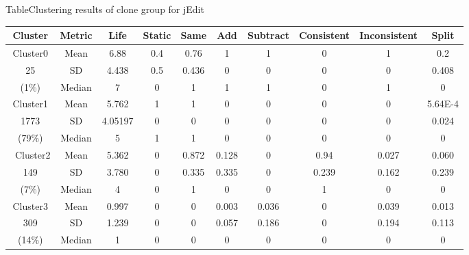 \begin{table}[htbp]
{Table$\!$}{Clustering results of clone group for jEdit}
\vspace{0.5em}
\centering
\footnotesize
\begin{tabular}{cccccccccc}
\toprule[1.5pt]
{Cluster}&{Metric}&Life&Static &Same &Add &Subtract &Consistent &	Inconsistent &Split \\ 
\midrule[1pt]
Cluster0&	Mean	&6.88	&0.4	&0.76	&1	&1	&0	&1	&0.2\\
25	&SD&4.438	&0.5	&0.436	&0	&0	&0	&0	&0.408\\ 
(1\%)	&Median	&7	&0	&1	&1	&1	&0	&1	&0\\ 
\hline
Cluster1	&Mean	&5.762	&1	&1	&0	&0	&0	&0	&5.64E-4\\
1773	&SD&4.05197	&0	&0	&0	&0	&0	&0	&0.024\\
(79\%)&	Median&	5	&1&	1&	0&	0&	0&	0&	0\\ 
\hline\
Cluster2	&Mean	&5.362&	0&	0.872&	0.128&	0&	0.94&	0.027&	0.060\\
149&	SD&	3.780&	0&	0.335&	0.335&	0&	0.239 &	0.162 &	0.239 \\ 
(7\%)&	Median&	4&	0&	1&	0&	0&	1&	0&	0\\ 
\hline
Cluster3	&Mean	&0.997&	0&	0	&0.003&0.036	&0	&0.039	&0.013\\ 
309	&SD&1.239&0	&0	&0.057&0.186&0	&0.194&0.113\\ 
(14\%)&	Median&	1&	0&	0&	0&	0&	0&	0&	0\\ 
\bottomrule[1.5pt]
\end{tabular}
\end{table}

